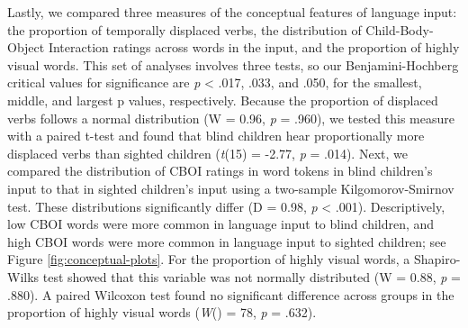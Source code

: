 \documentclass[
  man,floatsintext]{apa6}
\begin{document}
Lastly, we compared three measures of the conceptual features of language input: the proportion of temporally displaced verbs, the distribution of Child-Body-Object Interaction ratings across words in the input, and the proportion of highly visual words. This set of analyses involves three tests, so our Benjamini-Hochberg critical values for significance are \emph{p} \textless{} .017, .033, and .050, for the smallest, middle, and largest p values, respectively. Because the proportion of displaced verbs follows a normal distribution (W = 0.96, \emph{p} = .960), we tested this measure with a paired t-test and found that blind children hear proportionally more displaced verbs than sighted children (\emph{t}(15) = -2.77, \emph{p} = .014). Next, we compared the distribution of CBOI ratings in word tokens in blind children's input to that in sighted children's input using a two-sample Kilgomorov-Smirnov test. These distributions significantly differ (D = 0.98, \emph{p} \textless{} .001). Descriptively, low CBOI words were more common in language input to blind children, and high CBOI words were more common in language input to sighted children; see Figure \ref{fig:conceptual-plots}. For the proportion of highly visual words, a Shapiro-Wilks test showed that this variable was not normally distributed (W = 0.88, \emph{p} = .880). A paired Wilcoxon test found no significant difference across groups in the proportion of highly visual words (\emph{W}() = 78, \emph{p} = .632).
\end{document}

